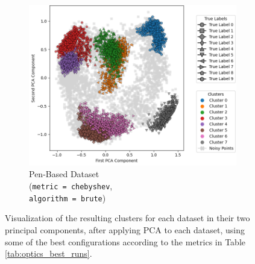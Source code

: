 \begin{figure}[H]
\begin{subfigure}{0.32\textwidth}
	\end{subfigure}
	\hfill
	\begin{subfigure}{0.32\textwidth}
		\centering
		\includegraphics[width=\linewidth]{figures/Optics/pen-based/best_run_CHS_pca.png}
		\caption{Pen-Based Dataset \\ (\texttt{metric = chebyshev}, \\ \texttt{algorithm = brute})}
	\end{subfigure}
	\caption{Visualization of the resulting clusters for each dataset in their two principal components, after applying PCA to each dataset, using some of the best configurations according to the metrics in Table \ref{tab:optics_best_runs}.}
	\label{fig:optics-clusters-br-pca}
\end{figure}


